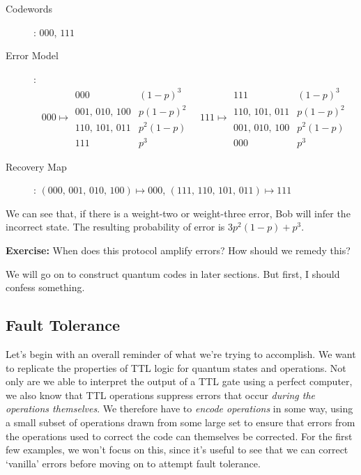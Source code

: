 \documentclass[10pt,a4paper, english]{scrartcl}
\begin{document}
\begin{description}
\item[Codewords]: $000$, $111$
\item[Error Model]:
\begin{equation}
000 \mapsto \begin{array}{cl}
000 & (1-p)^3 \\ 001,\, 010,\, 100 & p(1-p)^2 \\ 110,\, 101,\, 011 & p^2(1-p) \\ 111 & p^3
\end{array} \quad 
111 \mapsto \begin{array}{cl}
111 & (1-p)^3 \\ 110,\, 101,\, 011 & p(1-p)^2 \\ 001,\, 010,\, 100 & p^2(1-p) \\ 000 & p^3
\end{array}
\end{equation} 
\item[Recovery Map]: $(000,\,001,\,010,\,100) \mapsto 000$, $(111,\,110,\,101,\,011) \mapsto 111$
\end{description}
We can see that, if there is a weight-two or weight-three error, Bob will infer the incorrect state.
The resulting probability of error is $3p^2(1-p) + p^3$. 

\textbf{Exercise: } When does this protocol amplify errors? How should we remedy this?

We will go on to construct quantum codes in later sections. 
But first, I should confess something.
\subsection{Fault Tolerance}
Let's begin with an overall reminder of what we're trying to accomplish.
We want to replicate the properties of TTL logic for quantum states and operations.
Not only are we able to interpret the output of a TTL gate using a perfect computer, we also know that TTL operations suppress errors that occur \emph{during the operations themselves}. 
We therefore have to \emph{encode operations} in some way, using a small subset of operations drawn from some large set to ensure that errors from the operations used to correct the code can themselves be corrected. 
For the first few examples, we won't focus on this, since it's useful to see that we can correct `vanilla' errors before moving on to attempt fault tolerance.
\end{document}
